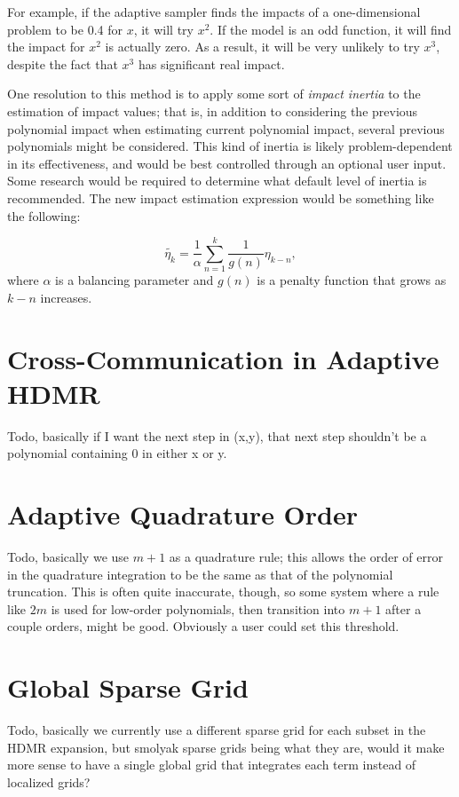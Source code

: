 For example, if the adaptive sampler finds the impacts of a one-dimensional problem to be 0.4 for $x$, it will
try $x^2$.  If the model is an odd function, it will find the impact for $x^2$ is actually zero.  As a result,
it will be very unlikely to try $x^3$, despite the fact that $x^3$ has significant real impact.

One resolution to this method is to apply some sort of \emph{impact inertia} to the estimation of impact
values; that is, in addition to considering the previous polynomial impact when estimating current polynomial
impact, several previous polynomials might be considered.  This kind of inertia is likely problem-dependent in
its effectiveness, and would be best controlled through an optional user input.  Some research would be
required to determine what default level of inertia is recommended.  The new impact estimation expression
would be something like the following:

\begin{equation}
  \tilde{\eta_k}= \frac{1}{\alpha}\sum_{n=1}^k \frac{1}{g(n)}\eta_{k-n},
\end{equation}
where $\alpha$ is a balancing parameter and $g(n)$ is a penalty function that grows as $k-n$ increases.

\section{Cross-Communication in Adaptive HDMR}
Todo, basically if I want the next step in (x,y), that next step shouldn't be a polynomial containing 0 in
either x or y.

\section{Adaptive Quadrature Order}
Todo, basically we use $m+1$ as a quadrature rule; this allows the order of error in the quadrature integration to be the same as
that of the polynomial truncation.  This is often quite inaccurate, though, so some system where a rule like $2m$ is used for
low-order polynomials, then transition into $m+1$ after a couple orders, might be good.  Obviously a user could set this threshold.

\section{Global Sparse Grid}
Todo, basically we currently use a different sparse grid for each subset in the HDMR expansion, but smolyak
sparse grids being what they are, would it make more sense to have a single global grid that integrates each
term instead of localized grids?
